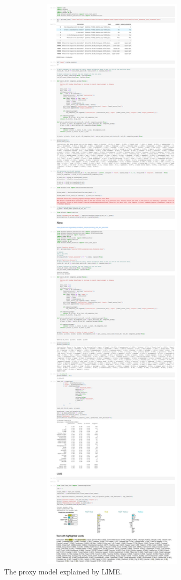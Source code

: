     
    \begin{figure}[htb]
        \centerline{
        \includegraphics[width=1.2\textwidth]{images/LIME_crop.pdf}}
        \caption{The proxy model explained by LIME.}
        \label{fig:lime_crop}
    \end{figure} 

